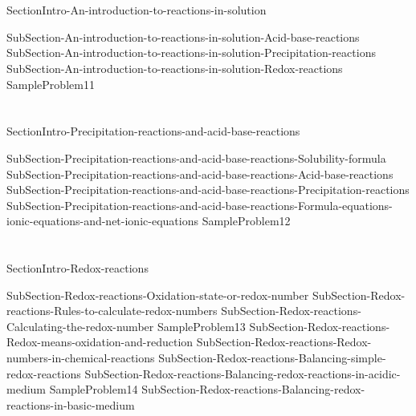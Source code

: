 \documentclass[main.tex]{subfiles} %
\begin{document}
\section{\color{blue!30!black}{An introduction to reactions in solution}}
{SectionIntro-An-introduction-to-reactions-in-solution}
\sloppy \begin{description}
 {SubSection-An-introduction-to-reactions-in-solution-Acid-base-reactions}
{SubSection-An-introduction-to-reactions-in-solution-Precipitation-reactions}
{SubSection-An-introduction-to-reactions-in-solution-Redox-reactions}
{SampleProblem11}
\end{description}
\section{\color{blue!30!black}{Precipitation reactions and acid-base reactions}}
{SectionIntro-Precipitation-reactions-and-acid-base-reactions}
\sloppy \begin{description}
{SubSection-Precipitation-reactions-and-acid-base-reactions-Solubility-formula}
{SubSection-Precipitation-reactions-and-acid-base-reactions-Acid-base-reactions}
{SubSection-Precipitation-reactions-and-acid-base-reactions-Precipitation-reactions}
{SubSection-Precipitation-reactions-and-acid-base-reactions-Formula-equations-ionic-equations-and-net-ionic-equations}
{SampleProblem12}
\end{description}
\section{\color{blue!30!black}{Redox reactions}}
{SectionIntro-Redox-reactions}
\sloppy \begin{description}
{SubSection-Redox-reactions-Oxidation-state-or-redox-number}
 {SubSection-Redox-reactions-Rules-to-calculate-redox-numbers}
 {SubSection-Redox-reactions-Calculating-the-redox-number}
 {SampleProblem13}
{SubSection-Redox-reactions-Redox-means-oxidation-and-reduction}
 {SubSection-Redox-reactions-Redox-numbers-in-chemical-reactions}
 {SubSection-Redox-reactions-Balancing-simple-redox-reactions}
{SubSection-Redox-reactions-Balancing-redox-reactions-in-acidic-medium}
{SampleProblem14}
{SubSection-Redox-reactions-Balancing-redox-reactions-in-basic-medium}
\end{description}
\end{document}
